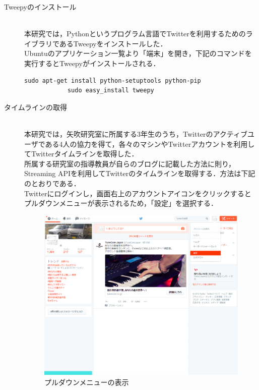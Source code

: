 \begin{description}
 \item[Tweepyのインストール]\mbox{}\\
	本研究では，Pythonというプログラム言語でTwitterを利用するためのライブラリであるTweepyをインストールした．\\
	Ubuntuのアプリケーション一覧より「端末」を開き，下記のコマンドを実行するとTweepyがインストールされる．
		
		\begin{lstlisting}[caption={}, label={}]
			sudo apt-get install python-setuptools python-pip
			sudo easy_install tweepy
		\end{lstlisting}
		
 \item[タイムラインの取得]\mbox{}\\
	本研究では，矢吹研究室に所属する3年生のうち，Twitterのアクティブユーザである4人の協力を得て，各々のマシンやTwitterアカウントを利用してTwitterタイムラインを取得した．\\
	所属する研究室の指導教員が自らのブログに記載した方法に則り，Streaming APIを利用してTwitterのタイムラインを取得する．方法は下記のとおりである．\\
	Twitterにログインし，画面右上のアカウントアイコンをクリックするとプルダウンメニューが表示されるため，「設定」を選択する．\\
	
	\begin{figure}[H]
	\centering
	\includegraphics[width=15cm]{TwitterHome.png}
	\caption{プルダウンメニューの表示}\label{pulldown}
	\end{figure}
	

\end{description}
